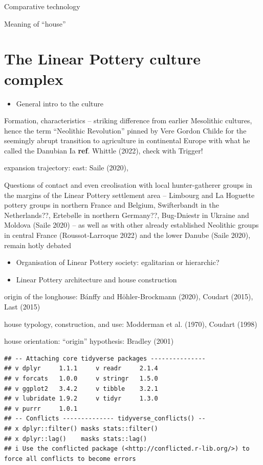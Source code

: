 \documentclass[
  12pt,
]{book}
\providecommand{\tightlist}{%
  \setlength{\itemsep}{0pt}\setlength{\parskip}{0pt}}
\begin{document}
Comparative technology

Meaning of ``house''

\hypertarget{lbk}{%
\section{The Linear Pottery culture complex}\label{lbk}}

\begin{itemize}
\tightlist
\item
  General intro to the culture
\end{itemize}

Formation, characteristics -- striking difference from earlier Mesolithic cultures, hence the term ``Neolithic Revolution'' pinned by Vere Gordon Childe for the seemingly abrupt transition to agriculture in continental Europe with what he called the Danubian Ia \textbf{ref}. Whittle (2022), check with Trigger!

expansion trajectory: east: Saile (2020),

Questions of contact and even creolisation with local hunter-gatherer groups in the margins of the Linear Pottery settlement area -- Limbourg and La Hoguette pottery groups in northern France and Belgium, Swifterbandt in the Netherlands??, Ertebølle in northern Germany??, Bug-Dniestr in Ukraine and Moldova (Saile 2020) -- as well as with other already established Neolithic groups in central France (Roussot‑Larroque 2022) and the lower Danube (Saile 2020), remain hotly debated

\begin{itemize}
\tightlist
\item
  Organisation of Linear Pottery society: egalitarian or hierarchic?
\item
  Linear Pottery architecture and house construction
\end{itemize}

origin of the longhouse: Bánffy and Höhler-Brockmann (2020), Coudart (2015), Last (2015)

house typology, construction, and use: Modderman et al. (1970), Coudart (1998)

house orientation: ``origin'' hypothesis: Bradley (2001)

\begin{verbatim}
## -- Attaching core tidyverse packages ---------------
## v dplyr     1.1.1     v readr     2.1.4
## v forcats   1.0.0     v stringr   1.5.0
## v ggplot2   3.4.2     v tibble    3.2.1
## v lubridate 1.9.2     v tidyr     1.3.0
## v purrr     1.0.1     
## -- Conflicts -------------- tidyverse_conflicts() --
## x dplyr::filter() masks stats::filter()
## x dplyr::lag()    masks stats::lag()
## i Use the conflicted package (<http://conflicted.r-lib.org/>) to force all conflicts to become errors
\end{verbatim}
\end{document}
